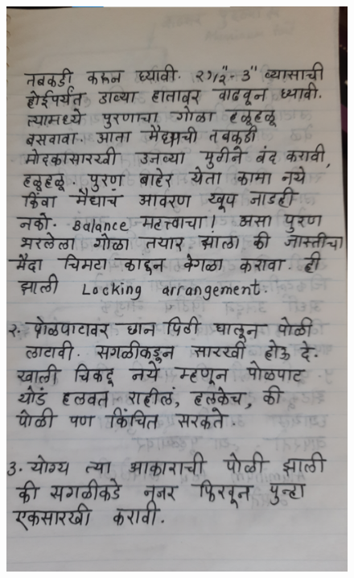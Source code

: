 \documentclass[17pt]{extarticle}  %
\begin{document}
\begin{figure}[h!]
    \centering
    \includegraphics{img/11-s.png}
\end{figure}
\end{document}
